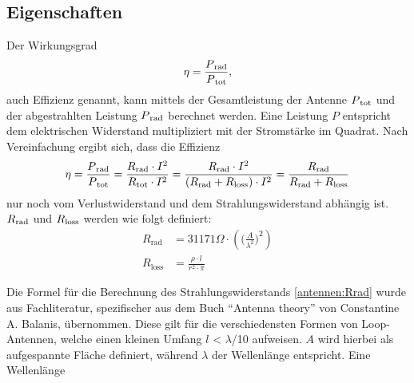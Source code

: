 \subsection{Eigenschaften\label{antennen:antennenEigenschaften}}
Der Wirkungsgrad
\begin{equation}
	\eta=\frac{P\textsubscript{rad}}{P\textsubscript{tot}},
	\label{antennen:Wirkungsgrad}
\end{equation}
auch Effizienz genannt, kann mittels der Gesamtleistung der Antenne $P\textsubscript{tot}$ und der abgestrahlten Leistung $P\textsubscript{rad}$ berechnet werden. Eine Leistung $P$ entspricht dem elektrischen Widerstand multipliziert mit der Stromstärke im Quadrat. Nach Vereinfachung ergibt sich, dass die Effizienz
\begin{equation}
	\eta=\frac{P\textsubscript{rad}}{P\textsubscript{tot}}=\frac{R\textsubscript{rad}\cdot{I^2}}{R\textsubscript{tot}\cdot{I^2}}=\frac{R\textsubscript{rad}\cdot{I^2}}{(R\textsubscript{rad}+R\textsubscript{loss})\cdot{I^2}}=\frac{R\textsubscript{rad}}{R\textsubscript{rad}+R\textsubscript{loss}}
	\label{antennen:Wirkungsgradkomplett}
\end{equation}
nur noch vom Verlustwiderstand und dem Strahlungswiderstand abhängig ist. $R\textsubscript{rad}$ und $R\textsubscript{loss}$ werden wie folgt definiert:
\begin{align}
	R_{\text{rad}} &= 31171 \Omega \cdot \left( \bigg( \frac{A}{\lambda^2} \bigg)^2 \right) \tag{20.3} \label{antennen:Rrad} \\
	R_{\text{loss}} &= \frac{\rho \cdot l}{r^2 \cdot \pi} \tag{20.4} \label{antennen:Rloss}
\end{align}

Die Formel für die Berechnung des Strahlungswiderstands \eqref{antennen:Rrad} wurde aus Fachliteratur, spezifischer aus dem Buch ``Antenna theory'' von Constantine A. Balanis, übernommen. Diese gilt für die verschiedensten Formen von Loop-Antennen, welche einen kleinen Umfang  $l$ < $\lambda$/10 aufweisen. $A$ wird hierbei als aufgespannte Fläche definiert, während $\lambda$ der Wellenlänge entspricht. Eine Wellenlänge 
\setcounter{equation}{4}

